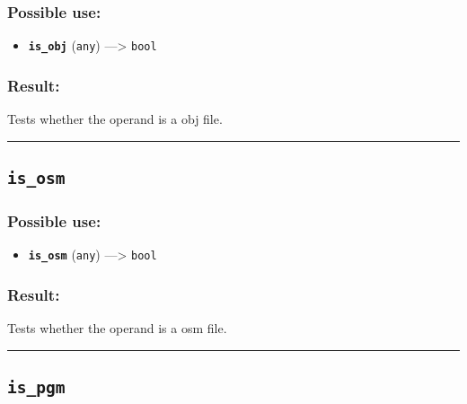 \documentclass[]{book}
\providecommand{\tightlist}{%
  \setlength{\itemsep}{0pt}\setlength{\parskip}{0pt}}
\theoremstyle{definition}
\theoremstyle{definition}
\theoremstyle{definition}
\theoremstyle{remark}
\begin{document}
\subsubsection{Possible use:}\label{possible-use-297}

\begin{itemize}
\tightlist
\item
  \textbf{\texttt{is\_obj}} (\texttt{any}) ---\textgreater{}
  \texttt{bool}
\end{itemize}

\subsubsection{Result:}\label{result-287}

Tests whether the operand is a obj file.

\begin{center}\rule{0.5\linewidth}{\linethickness}\end{center}

\subsection{\texorpdfstring{\texttt{is\_osm}}{is\_osm}}\label{is_osm}

\subsubsection{Possible use:}\label{possible-use-298}

\begin{itemize}
\tightlist
\item
  \textbf{\texttt{is\_osm}} (\texttt{any}) ---\textgreater{}
  \texttt{bool}
\end{itemize}

\subsubsection{Result:}\label{result-288}

Tests whether the operand is a osm file.

\begin{center}\rule{0.5\linewidth}{\linethickness}\end{center}

\subsection{\texorpdfstring{\texttt{is\_pgm}}{is\_pgm}}\label{is_pgm}
\end{document}
